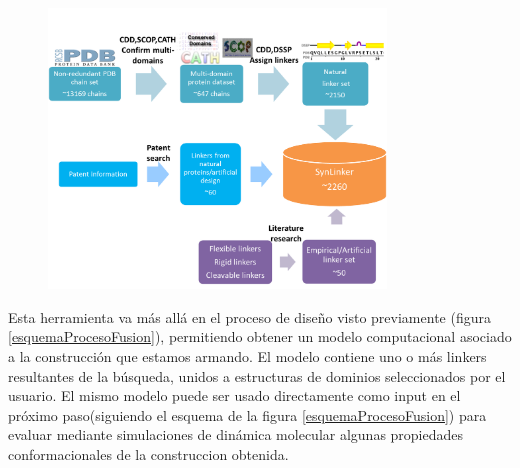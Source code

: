 \begin{figure}[ht]
\centering
\includegraphics[width=0.8\textwidth]{img/synLink.png} 
\caption{ } 
\label{SynLinker}
\end{figure}


Esta herramienta va más allá en el proceso de diseño visto previamente (figura \ref{esquemaProcesoFusion}), permitiendo obtener un modelo computacional asociado a la construcción que estamos armando. 
El modelo contiene uno o más linkers resultantes de la búsqueda, unidos a estructuras de dominios seleccionados por el usuario.
El mismo modelo puede ser usado directamente como input en el próximo paso(siguiendo el esquema de la figura \ref{esquemaProcesoFusion}) para evaluar mediante simulaciones 
de dinámica molecular algunas propiedades conformacionales de la construccion obtenida.


